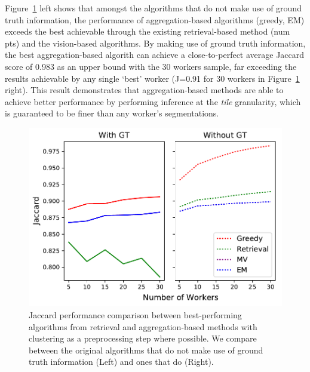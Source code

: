 Figure~\ref{retrieval_vs_aggregation} left shows that amongst the algorithms that do not make use of ground truth information, the performance of aggregation-based algorithms (greedy, EM) exceeds the best achievable through the existing retrieval-based method (num pts) and the vision-based algorithms. 
By making use of ground truth information, the best aggregation-based algorith can achieve a close-to-perfect average Jaccard score of 0.983 as an upper bound with the 30 workers sample, far exceeding the results achievable by any single `best' worker (J=0.91 for 30 workers in Figure~\ref{retrieval_vs_aggregation} right). This result demonstrates that aggregation-based methods are able to achieve better performance by performing inference at the \textit{tile} granularity, which is guaranteed to be finer than any worker's segmentations. 
 \begin{figure}[h!]
   \centering
   \includegraphics[width=\textwidth]{plots/Retrieval_vs_Aggregation.pdf}
   \caption{Jaccard performance comparison between best-performing algorithms from retrieval and aggregation-based methods with clustering as a preprocessing step where possible. We compare between the original algorithms that do not make use of ground truth information (Left) and ones that do (Right).}
   \label{retrieval_vs_aggregation}
 \end{figure}



